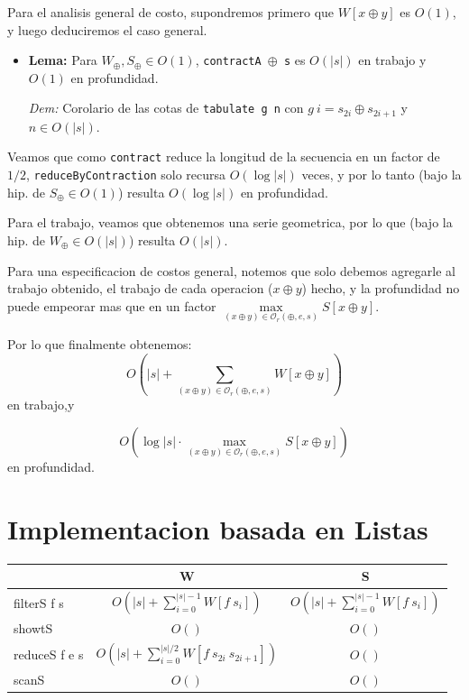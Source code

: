 \documentclass[12pt]{article}
\begin{document}
Para el analisis general de costo, supondremos primero que $W[x \oplus y]$ es $O(1)$, y luego deduciremos el caso general.

\begin{itemize}
\item \textbf{Lema:} Para $W_\oplus,S_\oplus \in O(1)$, \texttt{contractA $\oplus$ s} es $O(|s|)$ en trabajo y $O(1)$ en profundidad.

 \textit{Dem:} Corolario de las cotas de \texttt{tabulate g n} con $g\ i = s_{2i}\oplus s_{2i+1}$ y $n\in O(|s|)$.
\end{itemize}

Veamos que como \texttt{contract} reduce la longitud de la secuencia en un factor de $1/2$, \texttt{reduceByContraction} solo recursa $O(\log |s|)$ veces, y por lo tanto (bajo la hip. de $S_\oplus \in O(1)$) resulta $O(\log |s|)$ en profundidad.

Para el trabajo, veamos que obtenemos una serie geometrica, por lo que (bajo la hip. de $W_\oplus \in O(|s|)$) resulta $O(|s|)$.

Para una especificacion de costos general, notemos que solo debemos agregarle al trabajo obtenido, el trabajo de cada operacion ($x\oplus y$) hecho, y la profundidad no puede empeorar mas que en un factor $\max\limits_{(x\oplus y)\in\mathcal{O}_r(\oplus,e,s)} S[x\oplus y]$.

Por lo que finalmente obtenemos:
$$O(|s| + \sum\limits_{(x\oplus y)\in\mathcal{O}_r(\oplus,e,s)} W[x\oplus y])$$ en trabajo,y

$$ O(\log |s|\cdot \max\limits_{(x\oplus y)\in\mathcal{O}_r(\oplus,e,s)} S[x\oplus y])$$ en profundidad.


\section{Implementacion basada en Listas}

\begin{tabular}{@{}lcc@{}}
\toprule
        & W & S \\ 
\midrule
filterS f s & $O(|s| + \sum\limits_{i=0}^{|s|-1} W[f\ s_i])$  & $O(|s| + \sum\limits_{i=0}^{|s|-1} W[f\ s_i])$  \\
showtS  & $O()$  &  $O()$ \\
reduceS f e s & $O(|s| + \sum\limits_{i=0}^{|s|/2} W[f\ s_{2i}\ s_{2i+1}])$  &  $O()$ \\
scanS   & $O()$  &  $O()$ \\ 
\bottomrule
\end{tabular}
\end{document}
